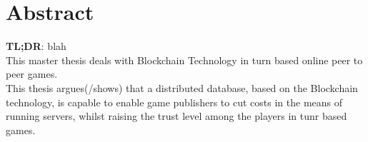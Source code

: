 

\section*{Abstract}
\label{sec:Abstract}

\textbf{TL;DR}: blah \\

This master thesis deals with Blockchain Technology in turn based online peer to peer games. \\

This thesis argues(/shows) that a distributed database, based on the Blockchain technology, is capable to enable game publishers to cut costs in the means of running servers, whilst raising the trust level among the players in tunr based games. \\




